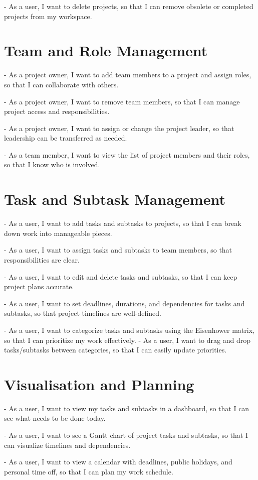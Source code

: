 \documentclass{report}
\begin{document}
- As a user, I want to delete projects, so that I can remove obsolete or completed projects from my workspace.

\section{Team and Role Management}
- As a project owner, I want to add team members to a project and assign roles, so that I can collaborate with others.

- As a project owner, I want to remove team members, so that I can manage project access and responsibilities.

- As a project owner, I want to assign or change the project leader, so that leadership can be transferred as needed.

- As a team member, I want to view the list of project members and their roles, so that I know who is involved.

\section{Task and Subtask Management}
- As a user, I want to add tasks and subtasks to projects, so that I can break down work into manageable pieces.

- As a user, I want to assign tasks and subtasks to team members, so that responsibilities are clear.

- As a user, I want to edit and delete tasks and subtasks, so that I can keep project plans accurate.

- As a user, I want to set deadlines, durations, and dependencies for tasks and subtasks, so that project timelines are well-defined.

- As a user, I want to categorize tasks and subtasks using the Eisenhower matrix, so that I can prioritize my work effectively.
- As a user, I want to drag and drop tasks/subtasks between categories, so that I can easily update priorities.

\section{Visualisation and Planning}
- As a user, I want to view my tasks and subtasks in a dashboard, so that I can see what needs to be done today.

- As a user, I want to see a Gantt chart of project tasks and subtasks, so that I can visualize timelines and dependencies.

- As a user, I want to view a calendar with deadlines, public holidays, and personal time off, so that I can plan my work schedule.
\end{document}
